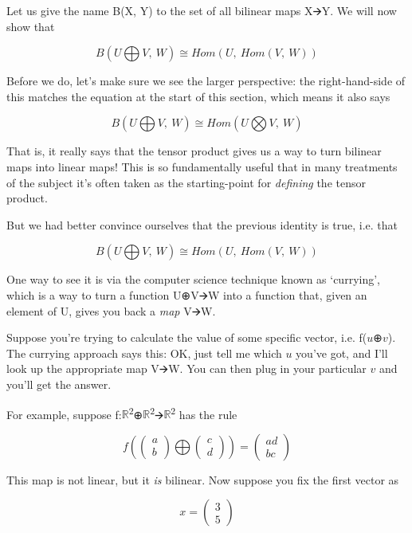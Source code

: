 \documentclass[oneside,english]{amsbook}
\numberwithin{section}{chapter}
\theoremstyle{plain}
\theoremstyle{definition}
\begin{document}
Let us give the name B(X, Y) to the set of all bilinear maps X🡪Y. We
will now show that

\[B(U\bigoplus V,\ W) \cong Hom(U,\ Hom(V,\ W))\]

Before we do, let's make sure we see the larger perspective: the
right-hand-side of this matches the equation at the start of this
section, which means it also says

\[B(U\bigoplus V,\ W) \cong Hom(U\bigotimes V,\ W)\]

That is, it really says that the tensor product gives us a way to turn
bilinear maps into linear maps! This is so fundamentally useful that in
many treatments of the subject it's often taken as the starting-point
for \emph{defining} the tensor product.

But we had better convince ourselves that the previous identity is true,
i.e. that

\[B(U\bigoplus V,\ W) \cong Hom(U,\ Hom(V,\ W))\]

One way to see it is via the computer science technique known as
`currying', which is a way to turn a function U⊕V🡪W into a function
that, given an element of U, gives you back a \emph{map} V🡪W.

Suppose you're trying to calculate the value of some specific vector,
i.e. f($u$⊕$v$). The currying approach says this: OK, just tell me
which $u$ you've got, and I'll look up the appropriate map V🡪W. You
can then plug in your particular $v$ and you'll get the answer.

For example, suppose
f:$\mathbb{R}$\textsuperscript{2}⊕$\mathbb{R}$\textsuperscript{2}🡪$\mathbb{R}$\textsuperscript{2}
has the rule

\[f\left( \begin{pmatrix}
	a \\
	b
\end{pmatrix}\bigoplus\begin{pmatrix}
	c \\
	d
\end{pmatrix} \right) = \begin{pmatrix}
	ad \\
	bc
\end{pmatrix}\]

This map is not linear, but it \emph{is} bilinear. Now suppose you fix
the first vector as

\[x = \begin{pmatrix}
	3 \\
	5
\end{pmatrix}\]
\end{document}
